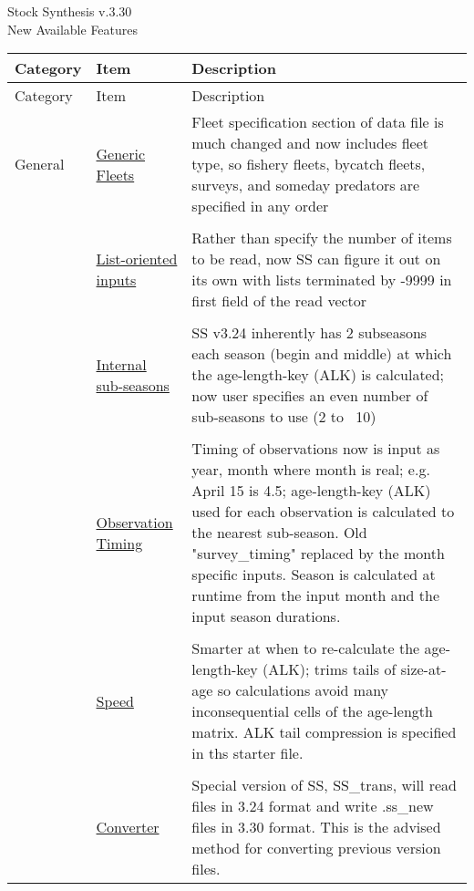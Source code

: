 \documentclass[12pt]{article}
\begin{document}
\begin{center}
	\Large{Stock Synthesis v.3.30\\
	New Available Features\\}
\end{center}

\begin{center}
	\begin{longtable}{p{2cm} p{3cm} p{10cm}}
	Category & Item & Description\\
	\hline
	\endfirsthead
	
	Category & Item & Description\\
	\hline
	\endhead
	
	\hline
	\endfoot
	
	\endlastfoot
	
	General & 
	\hyperlink{GenericFleets}{Generic Fleets} & 
	Fleet specification section of data file is much changed and now includes fleet type, so fishery fleets, bycatch fleets, surveys, and someday predators are specified in any order\\
	\\
	& \hyperlink{ListBased}{List-oriented inputs} & 
	Rather than specify the number of items to be read, now SS can figure it out on its own with lists terminated by -9999 in first field of the read vector \\
	\\					  
	& \hyperlink{SubSeas}{Internal sub-seasons} & 
	SS v3.24 inherently has 2 subseasons each season (begin and middle) at which the age-length-key (ALK) is calculated; now user specifies an even number of sub-seasons to use (2 to ~10) \\
	\\
	& \hyperlink{ObsTiming}{Observation Timing} & 
	Timing of observations now is input as year, month where month is real; e.g. April 15 is 4.5; age-length-key (ALK) used for each observation is calculated to the nearest sub-season.  Old "survey\_timing" replaced by the month specific inputs.  Season is calculated at runtime from the input month and the input season durations. \\
	\\
	& \hyperlink{ALK}{Speed} & 
	Smarter at when to re-calculate the age-length-key (ALK); trims tails of size-at-age so calculations avoid many inconsequential cells of the age-length matrix. ALK tail compression is specified in ths starter file.\\
	\\				
	& \hyperlink{Convert} {Converter} & 
	Special version of SS, SS\_trans, will read files in 3.24 format and write .ss\_new files in 3.30 format.  This is the advised method for converting previous version files.\\

\end{longtable}
\end{center}
\end{document}
